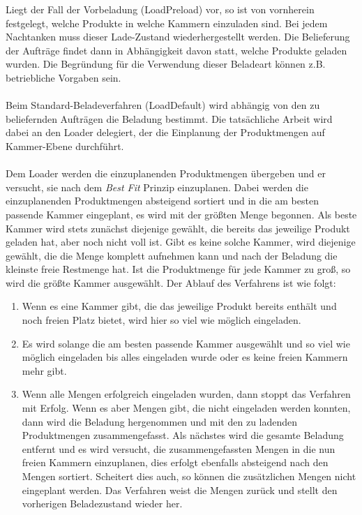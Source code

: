 \noindent
Liegt der Fall der Vorbeladung (\textsf{LoadPreload}) vor, so ist von vornherein festgelegt, welche Produkte in welche Kammern einzuladen sind. Bei jedem Nachtanken muss dieser Lade-Zustand wiederhergestellt werden. Die Belieferung der Aufträge findet dann in Abhängigkeit davon statt, welche Produkte geladen wurden. Die Begründung für die Verwendung dieser Beladeart können z.B. betriebliche Vorgaben sein. \\
\\
Beim Standard-Beladeverfahren (\textsf{LoadDefault}) wird abhängig von den zu beliefernden Aufträgen die Beladung bestimmt. Die tatsächliche Arbeit wird dabei an den \textsf{Loader} delegiert, der die Einplanung der Produktmengen auf Kammer-Ebene durchführt. \\
\\
Dem \textsf{Loader} werden die einzuplanenden Produktmengen übergeben und er versucht, sie nach dem \emph{Best Fit} Prinzip einzuplanen. Dabei werden die einzuplanenden Produktmengen absteigend sortiert und in die am besten passende Kammer eingeplant, es wird mit der größten Menge begonnen. Als beste Kammer wird stets zunächst diejenige gewählt, die bereits das jeweilige Produkt geladen hat, aber noch nicht voll ist. Gibt es keine solche Kammer, wird diejenige gewählt, die die Menge komplett aufnehmen kann und nach der Beladung die kleinste freie Restmenge hat. Ist die Produktmenge für jede Kammer zu groß, so wird die größte Kammer ausgewählt. Der Ablauf des Verfahrens ist wie folgt:
\begin{enumerate}
  \item Wenn es eine Kammer gibt, die das jeweilige Produkt bereits enthält und noch freien Platz bietet, wird hier so viel wie möglich eingeladen.
  \item Es wird solange die am besten passende Kammer ausgewählt und so viel wie möglich eingeladen bis alles eingeladen wurde oder es keine freien Kammern mehr gibt.
  \item Wenn alle Mengen erfolgreich eingeladen wurden, dann stoppt das Verfahren mit Erfolg. Wenn es aber Mengen gibt, die nicht eingeladen werden konnten, dann wird die Beladung hergenommen und mit den zu ladenden Produktmengen zusammengefasst. Als nächstes wird die gesamte Beladung entfernt und es wird versucht, die zusammengefassten Mengen in die nun freien Kammern einzuplanen, dies erfolgt ebenfalls absteigend nach den Mengen sortiert. Scheitert dies auch, so können die zusätzlichen Mengen nicht eingeplant werden. Das Verfahren weist die Mengen zurück und stellt den vorherigen Beladezustand wieder her. \\
\end{enumerate}

